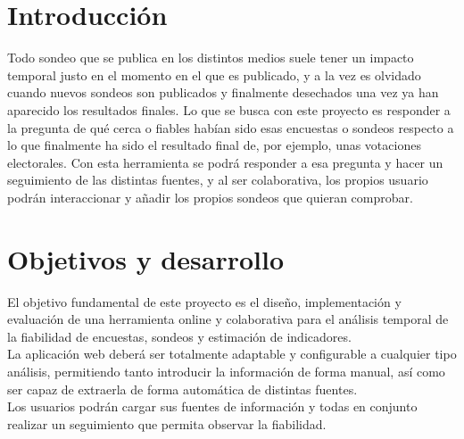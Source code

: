 
\section{Introducción}
\label{sec:introduccion}

Todo sondeo que se publica en los distintos medios suele tener un impacto temporal justo en el momento en el que es publicado, y a la vez es olvidado cuando nuevos sondeos son publicados y finalmente desechados una vez ya han aparecido los resultados finales. Lo que se busca con este proyecto es responder a la pregunta de qué cerca o fiables habían sido esas encuestas o sondeos respecto a lo que finalmente ha sido el resultado final de, por ejemplo, unas votaciones electorales.
Con esta herramienta se podrá responder a esa pregunta y hacer un seguimiento de las distintas fuentes, y al ser colaborativa, los propios usuario podrán interaccionar y añadir los propios sondeos que quieran comprobar. 


\section{Objetivos y desarrollo}
\label{sec:objetivos-y-campo}

El objetivo fundamental de este proyecto es el diseño, implementación y evaluación de una herramienta online y colaborativa para el análisis temporal de la fiabilidad de encuestas, sondeos y estimación de indicadores.\\
La aplicación web deberá ser totalmente adaptable y configurable a cualquier tipo análisis, permitiendo tanto introducir la información de forma manual, así como ser capaz de extraerla de forma automática de distintas fuentes.\\
Los usuarios podrán cargar sus fuentes de información y todas en conjunto realizar un seguimiento que permita observar la fiabilidad.

